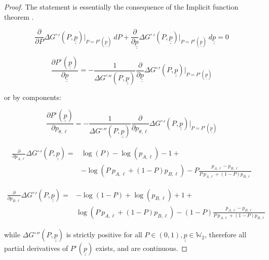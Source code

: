 \documentclass{article}
\theoremstyle{definition}
\begin{document}
\begin{proof}
    The statement is essentially the consequence of the Implicit function theorem \cite{book:ImplicitFunctionTheorem}.

    \begin{equation}
        \frac{\partial}{\partial P} \Delta G^\circ{}'(P,\underline{\underline{p}}) \Bigr|_{P=P^\circ(\underline{\underline{p}})} \ dP + 
        \frac{\partial}{\partial \underline{\underline{p}}} \Delta G^\circ{}'(P,\underline{\underline{p}})\Bigr|_{P=P^\circ(\underline{\underline{p}})} \ d \underline{\underline{p}}= 0
    \end{equation}

    \begin{equation}
        \frac{\partial P^\circ(\underline{\underline{p}})}{\partial \underline{\underline{p}}} = -\frac{1}{\Delta G^\circ{}''(P,\underline{\underline{p}})}
        \frac{\partial}{\partial \underline{\underline{p}}} \Delta G^\circ{}'(P,\underline{\underline{p}})\Bigr|_{P=P^\circ(\underline{\underline{p}})}
    \end{equation}

    or by components:

        \begin{equation}
        \frac{\partial P^\circ(\underline{\underline{p}})}{\partial p_{\theta,\ell}} = -\frac{1}{\Delta G^\circ{}''(P,\underline{\underline{p}})}
        \frac{\partial}{\partial p_{\theta,\ell}} \Delta G^\circ{}'(P,\underline{\underline{p}})\Bigr|_{P=P^\circ(\underline{\underline{p}})}
    \end{equation}

    \begin{equation}
        \begin{split}
            \frac{\partial}{\partial p_{A,\ell}} \Delta G^\circ{}'(P,\underline{\underline{p}}) = & \log(P) - \log(p_{A,\ell}) -1 +\\ 
            & - \log(P \ p_{A,\ell} + (1-P) p_{B,\ell}) - 
            P \frac{p_{A,\ell} -  p_{B,\ell}}{P \ p_{A,\ell} + (1-P) p_{B,\ell}} 
        \end{split}
    \end{equation}

        \begin{equation}
            \begin{split}
                \frac{\partial}{\partial p_{B,\ell}} \Delta G^\circ{}'(P,\underline{\underline{p}}) = &
            -\log(1-P) + \log(p_{B,\ell}) +1 +\\
            &\log(P \ p_{A,\ell} + (1-P) p_{B,\ell}) -(1-P) \frac{p_{A,\ell} -  p_{B,\ell}}{P \ p_{A,\ell} + (1-P) p_{B,\ell}} 
            \end{split}
    \end{equation}

    while $\Delta G^\circ{}''(P,\underline{\underline{p}})$ is strictly positive for all $P \in (0,1), \underline{\underline{p}} \in \mathbb{W}_2$, therefore all partial derivatives of $P^\circ(\underline{\underline{p}})$ exists, and are continuous.

\end{proof}
\end{document}
